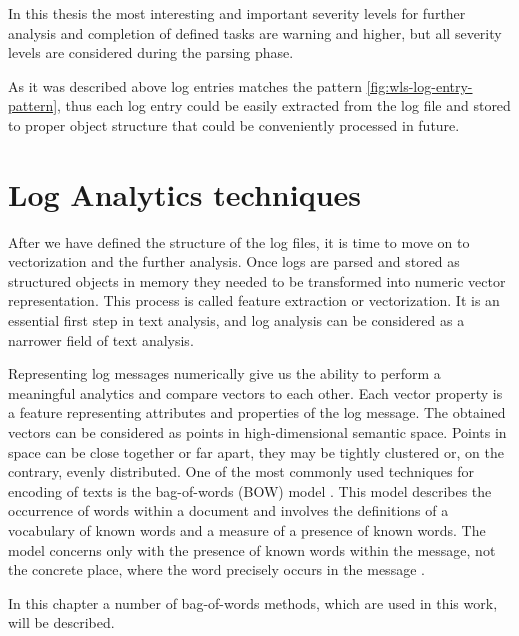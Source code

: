 \documentclass[thesis=M,english]{FITthesis}[2019/12/23]
\begin{document}
In this thesis the most interesting and important severity levels for further analysis and completion of defined tasks are warning and higher, but all severity levels are considered during the parsing phase. 

As it was described above log entries matches the pattern \ref{fig:wls-log-entry-pattern}, thus each log entry could be easily extracted from the log file and stored to proper object structure that could be conveniently processed in future.

\chapter{Log Analytics techniques}
After we have defined the structure of the log files, it is time to move on to vectorization and the further analysis. Once logs are parsed and stored as structured objects in memory they needed to be transformed into numeric vector representation. This process is called feature extraction or vectorization. It is an essential first step in text analysis, and log analysis can be considered as a narrower field of text analysis.

Representing log messages numerically give us the ability to perform a meaningful analytics and compare vectors to each other. Each vector property is a feature representing attributes and properties of the log message. The obtained vectors can be considered as points in high-dimensional semantic space. Points in space can be close together or far apart, they may be tightly clustered or, on the contrary, evenly distributed. One of the most commonly used techniques for encoding of texts is the bag-of-words (BOW) model \cite{vectorization}. This model describes the occurrence of words within a document and involves the definitions of a vocabulary of known words and a measure of a presence of known words. The model concerns only with the presence of known words within the message, not the concrete place, where the word precisely occurs in the message \cite{bag-of-words}.

In this chapter a number of bag-of-words methods, which are used in this work, will be described.
\end{document}

